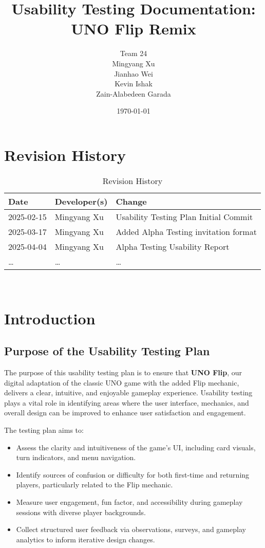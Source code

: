 \documentclass[12pt, titlepage]{article}
\date{}
\title{Usability Testing Documentation: UNO Flip Remix}
\author{Team 24 \\
Mingyang Xu\\
Jianhao Wei\\
Kevin Ishak\\
Zain-Alabedeen Garada}
\date{\today}
\begin{document}
	
\maketitle


\section{Revision History}

\begin{table}[hp]
\caption{Revision History} \label{TblRevisionHistory}
\begin{tabularx}{\textwidth}{llX}
\toprule
\textbf{Date} & \textbf{Developer(s)} & \textbf{Change}\\
\midrule
2025-02-15 & Mingyang Xu & Usability Testing Plan Initial Commit\\
2025-03-17 & Mingyang Xu & Added Alpha Testing invitation format\\
2025-04-04 & Mingyang Xu & Alpha Testing Usability Report\\
\dots & \dots & \dots \\
\bottomrule
\end{tabularx}
\end{table}

~\newpage

\newpage

\section{Introduction}

\subsection{Purpose of the Usability Testing Plan}
The purpose of this usability testing plan is to ensure that \textbf{UNO Flip}, our digital adaptation of the classic UNO game with the added Flip mechanic, delivers a clear, intuitive, and enjoyable gameplay experience. Usability testing plays a vital role in identifying areas where the user interface, mechanics, and overall design can be improved to enhance user satisfaction and engagement.

The testing plan aims to:
\begin{itemize}
    \item Assess the clarity and intuitiveness of the game's UI, including card visuals, turn indicators, and menu navigation.
    \item Identify sources of confusion or difficulty for both first-time and returning players, particularly related to the Flip mechanic.
    \item Measure user engagement, fun factor, and accessibility during gameplay sessions with diverse player backgrounds.
    \item Collect structured user feedback via observations, surveys, and gameplay analytics to inform iterative design changes.
\end{itemize}
\end{document}
